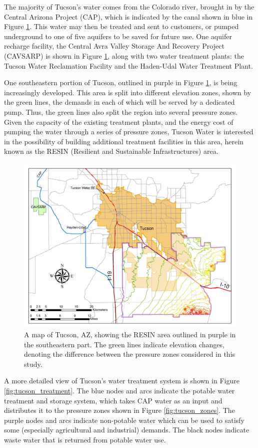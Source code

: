 \documentclass[opre,nonblindrev]{informs3} %
\begin{document}
The majority of Tucson's water comes from the Colorado river, brought in by the Central Arizona Project (CAP), which is indicated by the canal shown in blue in Figure \ref{fig:tucson_elevation}.
This water may then be treated and sent to customers, or pumped underground to one of five aquifers to be saved for future use.
One aquifer recharge facility, the Central Avra Valley Storage And Recovery Project (CAVSARP) is shown in Figure \ref{fig:tucson_elevation}, along with two water treatment plants: the Tucson Water Reclamation Facility and the Haden-Udal Water Treatment Plant.

One southeastern portion of Tucson, outlined in purple in Figure \ref{fig:tucson_elevation}, is being increasingly developed.
This area is split into different elevation zones, shown by the green lines, the demands in each of which will be served by a dedicated pump.
Thus, the green lines also split the region into several pressure zones.
Given the capacity of the existing treatment plants, and the energy cost of pumping the water through a series of pressure zones, Tucson Water is interested in the possibility of building additional treatment facilities  in this area, herein known as the RESIN (Resilient and Sustainable Infrastructures) area.

\begin{figure}
	\FIGURE
	{%
		\includegraphics*[width=.6\textwidth]{tucson_water_images/tucson_elevation.png}%
	}
	{
		A map of Tucson, AZ, showing the RESIN area outlined in purple in the southeastern part.
		The green lines indicate elevation changes, denoting the difference between the pressure zones considered in this study.
		\label{fig:tucson_elevation}
	}
	{}
\end{figure}

A more detailed view of Tucson's water treatment system is shown in Figure \ref{fig:tucson_treatment}.
The blue nodes and arcs indicate the potable water treatment and storage system, which takes CAP water as an input and distributes it to the pressure zones shown in Figure \ref{fig:tucson_zones}.
The purple nodes and arcs indicate non-potable water which can be used to satisfy some (especially agricultural and industrial) demands.
The black nodes indicate waste water that is returned from potable water use.
\end{document}

